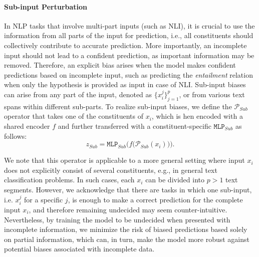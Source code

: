 \paragraph{Sub-input Perturbation} 
In NLP tasks that involve multi-part inputs (such as NLI), it is crucial to use the information from all parts of the input for prediction, i.e., all constituents should collectively contribute to accurate prediction. More importantly, an incomplete input should not lead to a confident prediction, as important information may be removed. 
Therefore, an explicit bias arises when the model makes confident predictions based on incomplete input, such as predicting the \textit{entailment} relation when only the hypothesis is provided as input in case of NLI. Sub-input biases can arise from any part of the input, denoted as $\{x_i^j\}_{j=1}^p$, or from various text spans within different sub-parts.
To realize sub-input biases, we define the $\mathcal{P}_{Sub}$ operator that takes one of the constituents of $x_i$, which is hen encoded with a shared encoder $f$ and further transferred with a constituent-specific $\texttt{MLP}_{Sub}$ as follows:
\begin{equation}
\label{eq:sub_aug}
    z_{Sub} = \texttt{MLP}_{Sub}\Big( f\big (\mathcal{P}_{Sub}(x_i)\big) \Big).
\end{equation}

\noindent We note that this operator is applicable to a more general setting where input $x_i$ does not explicitly consist of several constituents, e.g., in general text classification problems. In such cases, each $x_i$ can be divided into $p>1$ text segments. However, we acknowledge that there are tasks in which one sub-input, i.e. ${x_i^j}$ for a specific $j$, is enough to make a correct prediction for the complete input ${x_i}$, and therefore remaining undecided may seem counter-intuitive. Nevertheless, by training the model to be undecided when presented with incomplete information, we minimize the risk of biased predictions based solely on partial information, which can, in turn, make the model more robust against potential biases associated with incomplete data. 


